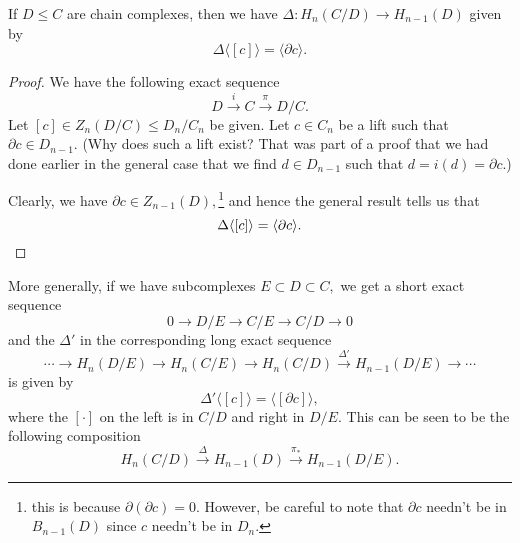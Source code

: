 \documentclass[12pt]{article}
\begin{document}
\begin{prop}
	If $D \le C$ are chain complexes, then we have $\Delta:H_n(C/D) \to H_{n-1}(D)$ given by
	\begin{equation*} 
		\Delta\langle [c]\rangle = \langle \partial c\rangle.
	\end{equation*}
\end{prop}
\begin{proof} 
	We have the following exact sequence
	\begin{equation*} 
	D\overset{i}{\longrightarrow}C\overset{\pi}{\longrightarrow}D/C.
\end{equation*}
	Let $[c] \in Z_n(D/C) \le D_n/C_n$ be given. Let $c \in C_n$ be a lift such that $\partial c \in D_{n-1}.$ (Why does such a lift exist? That was part of a proof that we had done earlier in the general case that we find $d \in D_{n-1}$ such that $d = i(d) = \partial c.$)

	Clearly, we have $\partial c \in Z_{n-1}(D),$\footnote{this is because $\partial(\partial c) = 0.$ However, be careful to note that $\partial c$ needn't be in $B_{n-1}(D)$ since $c$ needn't be in $D_n.$} and hence the general result tells us that
	\begin{equation*} 
		\Delta\langle [c]\rangle = \langle \partial c\rangle. \qedhere
	\end{equation*}
\end{proof}

More generally, if we have subcomplexes $E \subset D \subset C,$ we get a short exact sequence
\begin{equation*} 
	0 \to D/E \to C/E \to C/D \to 0
\end{equation*}
and the $\Delta'$ in the corresponding long exact sequence 
\begin{equation} \label{eq:longexacttriple}
	\cdots \to H_n(D/E) \to H_n(C/E) \to H_n(C/D) \overset{\Delta'}{\longrightarrow} H_{n-1}(D/E) \to \cdots
\end{equation}
is given by
\begin{equation*} 
	\Delta'\langle [c]\rangle = \langle [\partial c]\rangle,
\end{equation*}
where the $[\cdot]$ on the left is in $C/D$ and right in $D/E.$ This can be seen to be the following composition
\begin{equation} \label{eq:connectingcomposition}
	H_n(C/D) \overset{\Delta}{\longrightarrow} H_{n-1}(D) \overset{\pi_*}{\longrightarrow} H_{n-1}(D/E).
\end{equation}
\end{document}
